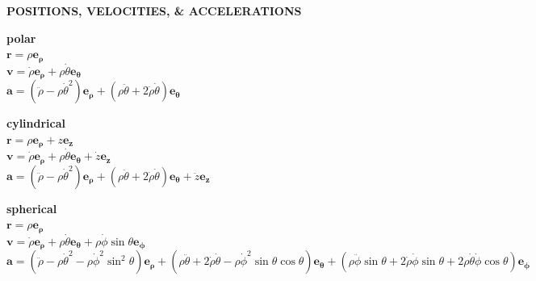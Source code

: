 \documentclass[letterpaper,landscape,10pt]{article}
\newenvironment{mydescription}
{\begin{description}
	\setlength{\itemsep}{0pt}
	\setlength{\parskip}{0pt}
	\setlength{\parsep}{-1pt}}
{\end{description}}
\begin{document}
{\begin{multicols}{4}
	\begin{center}
	  \begin{minipage}{\columnwidth}
		\textbf{POSITIONS, VELOCITIES, \& ACCELERATIONS}\\
	\begin{mydescription}
	  \item[\textbf{polar}] \ \\
		$\bm{\bm{r}} = \rho\bm{\bm{e_\rho}}$\\
		$\bm{\bm{v}} = \dot{\rho}\bm{\bm{e_\rho}} + \rho\dot\theta\bm{\bm{e_\theta}}$\\
		$\bm{\bm{a}} = \left(\ddot{\rho}-\rho\dot\theta^2\right)\bm{\bm{e_\rho}} + 
		\left( \rho\ddot\theta+2\dot{\rho}\dot\theta\right)\bm{\bm{e_\theta}}$\\
	\item[\textbf{cylindrical}] \ \\
		$\bm{\bm{r}} = \rho\bm{\bm{e_\rho}} + z\bm{\bm{e_z}}$\\
		$\bm{\bm{v}} = \dot{\rho}\bm{\bm{e_\rho}} + \rho\dot\theta\bm{\bm{e_\theta}} + \dot{z}\bm{\bm{e_z}}$\\
		$\bm{\bm{a}} = \left(\ddot{\rho}-\rho\dot\theta^2\right)\bm{\bm{e_\rho}} + 
		\left( \rho\ddot\theta+2\dot{\rho}\dot\theta\right)\bm{\bm{e_\theta}} +
		\ddot{z}\bm{\bm{e_z}}$

	\item[\textbf{spherical}] \ \\
		$\bm{\bm{r}} = \rho \bm{\bm{e_\rho}}$\\
		$\bm{\bm v} = \dot \rho \bm{\bm{e_\rho}} + \rho\dot \theta \bm{\bm{e_\theta}} +
			\rho \dot\phi\sin\theta\bm{\bm{e_\phi}}$\\
		$\bm{\bm{a}} = \left( \ddot \rho -
			\rho\dot\theta^2-\rho\dot\phi^2\sin^2\theta\right)\bm{\bm{e_\rho}} +
			\left(\rho\ddot\theta+2\dot \rho \dot\theta -
			\rho\dot\phi^2\sin\theta\cos\theta\right)\bm{\bm{e_\theta}} + \left(
			\rho\ddot\phi\sin\theta+2\dot \rho\dot\phi\sin\theta +
			2\rho\dot\theta\dot\phi\cos\theta\right)\bm{\bm{e_\phi}}$
	  \end{mydescription}


\end{minipage}
\end{center}
\end{multicols}}
\end{document}
